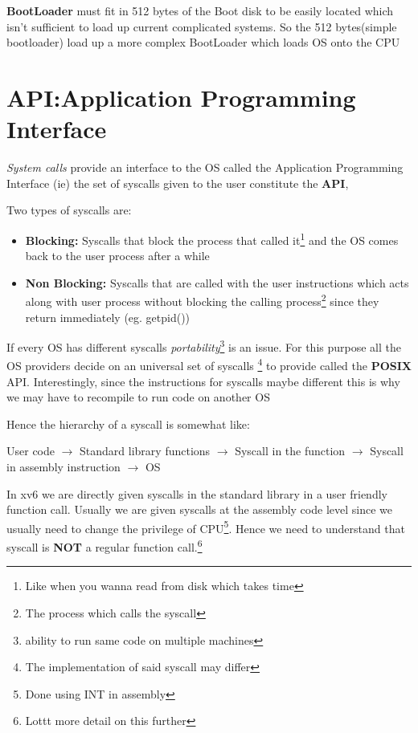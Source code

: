 \documentclass[12pt]{article}
\newcommand{\tbox}[1]{\noindent\fbox{\parbox{\textwidth}{#1}}}
\begin{document}
    \textbf{BootLoader} must fit in 512 bytes of the Boot disk to be easily located which isn't sufficient to load up current complicated systems.
    So the 512 bytes(simple bootloader) load up a more complex BootLoader which loads OS onto the CPU 

\noindent\tbox{
    \begin{center}
    \textbf{\Huge Lecture 3}
    \end{center}
}
\section{API:Application Programming Interface}
\textit{System calls} provide an interface to the OS called the Application Programming Interface (ie) the set of syscalls given
to the user constitute the \textbf{API},

Two types of syscalls are:
\begin{itemize}[topsep=0pt, partopsep=0pt, itemsep=0pt, parsep=0pt]
    \item \textbf{Blocking:} Syscalls that block the process that called it\footnote{Like when you wanna read from disk which takes time} and the OS comes back to the user process after a while
    \item \textbf{Non Blocking:} Syscalls that are called with the user instructions which acts along with user process without blocking the calling process\footnote{The process which calls the syscall} since they return immediately (eg. getpid())
\end{itemize}


If every OS has different syscalls \textit{portability}\footnote{ability to run same code on multiple machines} is an issue. For this purpose all the OS providers decide on an universal set of syscalls
\footnote{The implementation of said syscall may differ} to provide called the \textbf{POSIX} API. Interestingly, since the instructions for syscalls maybe different this is why we may have to recompile to run code on another OS

Hence the hierarchy of a syscall is somewhat like:
\begin{center}
    User code $\rightarrow$ Standard library functions $\rightarrow$ Syscall in the function $\rightarrow$ Syscall in assembly instruction $\rightarrow$ OS
\end{center}

In xv6 we are directly given syscalls in the standard library in a user friendly function call. Usually we are given syscalls at the assembly code level
since we usually need to change the privilege of CPU\footnote{Done using INT in assembly}. Hence we need to understand that syscall is \textbf{NOT} a regular function call.\footnote{Lottt more detail on this further}
\end{document}
